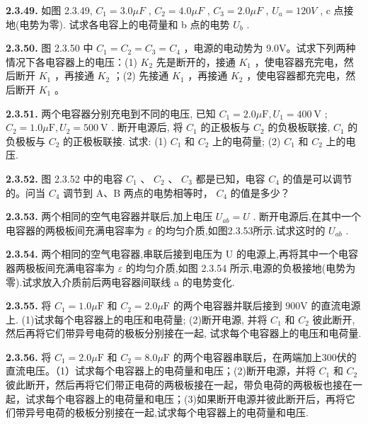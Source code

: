\vfill
\newpage

\textbf{2.3.49.} 如图 2.3.49, $C_{1}=3.0\mu F$ , $C_{2}=4.0\mu F$ , $C_{3}=2.0\mu F$ , $U_{a}=120V$ , c 点接地(电势为零). 试求各电容上的电荷量和 b 点的电势 $U_{b}$ .

\vfill
\newpage

\textbf{2.3.50.} 图 2.3.50 中 $C_{1}=C_{2}=C_{3}=C_{4}$ ，电源的电动势为 9.0V。试求下列两种情况下各电容器上的电压：(1) $K_{2}$ 先是断开的，接通 $K_{1}$ ，使电容器充完电，然后断开 $K_{1}$ ，再接通 $K_{2}$ ；(2) 先接通 $K_{1}$ ，再接通 $K_{2}$ ，使电容器都充完电，然后断开 $K_{1}$ 。

\vfill
\newpage

\textbf{2.3.51.} 两个电容器分别充电到不同的电压, 已知 $C_{1} = 2.0 \mu \mathrm{F}, U_{1} = 400 \mathrm{~V}$ ; $C_{2} = 1.0 \mu \mathrm{F}, U_{2} = 500 \mathrm{~V}$ . 断开电源后, 将 $C_{1}$ 的正极板与 $C_{2}$ 的负极板联接, $C_{1}$ 的负极板与 $C_{2}$ 的正极板联接. 试求: (1) $C_{1}$ 和 $C_{2}$ 上的电荷量; (2) $C_{1}$ 和 $C_{2}$ 上的电压.

\vfill
\newpage

\textbf{2.3.52.} 图 2.3.52 中的电容 $C_{1}$ 、 $C_{2}$ 、 $C_{3}$ 都是已知，电容 $C_{4}$ 的值是可以调节的。问当 $C_{4}$ 调节到 A、B 两点的电势相等时， $C_{4}$ 的值是多少？

\vfill
\newpage

\textbf{2.3.53.} 两个相同的空气电容器并联后,加上电压 $U_{ab}=U$ . 断开电源后,在其中一个电容器的两极板间充满电容率为 $\varepsilon$ 的均匀介质,如图2.3.53所示.试求这时的 $U_{ab}$ .

\vfill
\newpage

\textbf{2.3.54.} 两个相同的空气电容器,串联后接到电压为 U 的电源上,再将其中一个电容器两极板间充满电容率为 $\varepsilon$ 的均匀介质,如图 2.3.54 所示,电源的负极接地(电势为零).试求放入介质前后两电容器间联线 a 的电势变化.

\begin{center}
\end{center}

\vfill
\newpage

\textbf{2.3.55.} 将 $C_1 = 1.0\mu \mathrm{F}$ 和 $C_2 = 2.0\mu \mathrm{F}$ 的两个电容器并联后接到 $900\mathrm{V}$ 的直流电源上. (1)试求每个电容器上的电压和电荷量; (2)断开电源, 并将 $C_1$ 和 $C_2$ 彼此断开, 然后再将它们带异号电荷的极板分别接在一起, 试求每个电容器上的电压和电荷量.

\vfill
\newpage

\textbf{2.3.56.} 将 $C_1 = 2.0\mu \mathrm{F}$ 和 $C_2 = 8.0\mu \mathrm{F}$ 的两个电容器串联后，在两端加上300伏的直流电压。（1）试求每个电容器上的电荷量和电压；(2)断开电源，并将 $C_1$ 和 $C_2$ 彼此断开，然后再将它们带正电荷的两极板接在一起，带负电荷的两极板也接在一起，试求每个电容器上的电荷量和电压；(3)如果断开电源并彼此断开后，再将它们带异号电荷的极板分别接在一起,试求每个电容器上的电荷量和电压.

